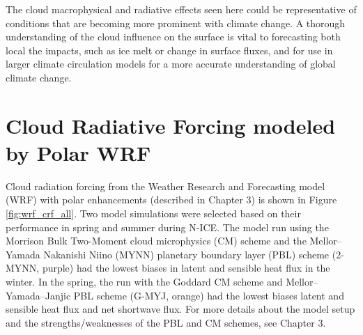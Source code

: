 The cloud macrophysical and radiative effects seen here could be representative of conditions that are becoming more prominent with climate change. A thorough understanding of the cloud influence on the surface is vital to forecasting both local the impacts, such as ice melt or change in surface fluxes, and for use in larger climate circulation models for a more accurate understanding of global climate change. 

\section{Cloud Radiative Forcing modeled by Polar WRF}
Cloud radiation forcing from the Weather Research and Forecasting model (WRF) with polar enhancements (described in Chapter 3) is shown in Figure \ref{fig:wrf_crf_all}. Two model simulations were selected based on their performance in spring and summer during N-ICE. The model run using the Morrison Bulk Two-Moment cloud microphysics (CM) scheme and the Mellor–Yamada Nakanishi Niino (MYNN) planetary boundary layer (PBL) scheme (2-MYNN, purple) had the lowest biases in latent and sensible heat flux in the winter. In the spring, the run with the Goddard CM scheme and Mellor–Yamada–Janjic PBL scheme (G-MYJ, orange) had the lowest biases latent and sensible heat flux and net shortwave flux. For more details about the model setup and the strengths/weaknesses of the PBL and CM schemes, see Chapter 3.

